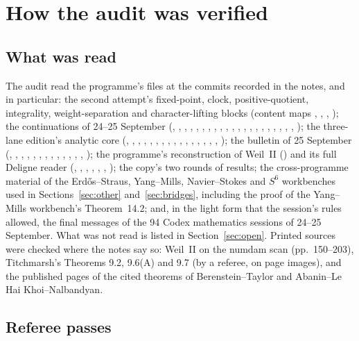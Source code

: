 \section{How the audit was verified}\label{app:verification}

\subsection{What was read}

The audit read the programme's files at the commits recorded in the notes, and in particular: the second attempt's fixed-point, clock, positive-quotient, integrality, weight-separation and character-lifting blocks (content maps , , , ); the continuations of 24--25 September (, , , , , , , , , , , , , , , , , , , , , ); the three-lane edition's analytic core (, , , , , , , , , , , , , , , , ); the bulletin of 25 September (, , , , , , , , , , , , , ); the programme's reconstruction of Weil~II () and its full Deligne reader (, , , , , , ); the copy's two rounds of results; the cross-programme material of the Erdős--Straus, Yang--Mills, Navier--Stokes and $S^6$ workbenches used in Sections~\ref{sec:other} and~\ref{sec:bridges}, including the proof of the Yang--Mills workbench's Theorem~14.2; and, in the light form that the session's rules allowed, the final messages of the 94 Codex mathematics sessions of 24--25 September. What was not read is listed in Section~\ref{sec:open}.
Printed sources were checked where the notes say so: Weil~II on the numdam scan (pp.~150--203), Titchmarsh's Theorems 9.2, 9.6(A) and 9.7 (by a referee, on page images), and the published pages of the cited theorems of Berenstein--Taylor and Abanin--Le Hai Khoi--Nalbandyan.

\subsection{Referee passes}

